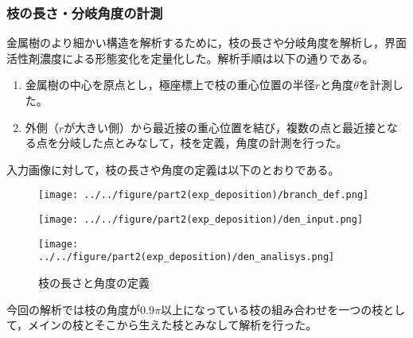 \documentclass[autodetect-engine,dvi=dvipdfmx,a4paper,ja=standard,oneside,openany,11pt,draft]{bxjsarticle}
\begin{document}
\subsubsection{枝の長さ・分岐角度の計測}
金属樹のより細かい構造を解析するために，枝の長さや分岐角度を解析し，界面活性剤濃度による形態変化を定量化した。解析手順は以下の通りである。
\begin{enumerate}
  \item 金属樹の中心を原点とし，極座標上で枝の重心位置の半径$r$と角度$\theta$を計測した。
  \item 外側（$r$が大きい側）から最近接の重心位置を結び，複数の点と最近接となる点を分岐した点とみなして，枝を定義，角度の計測を行った。
\end{enumerate}
入力画像に対して，枝の長さや角度の定義は以下のとおりである。
\begin{figure}
  \begin{minipage}
    {0.32\textwidth}
    \centering
    \texttt{[image: ../../figure/part2(exp\_deposition)/branch\_def.png]}
    \label{fig:branch_def}
  \end{minipage}
  \begin{minipage}
    {0.32\textwidth}
    \centering
    \texttt{[image: ../../figure/part2(exp\_deposition)/den\_input.png]}
    \label{fig:den_input}
  \end{minipage}
  \begin{minipage}
    {0.32\textwidth}
    \centering
    \texttt{[image: ../../figure/part2(exp\_deposition)/den\_analisys.png]}
    \label{fig:den_analisys}
  \end{minipage}
  \caption{枝の長さと角度の定義}
\end{figure}
今回の解析では枝の角度が$0.9\pi$以上になっている枝の組み合わせを一つの枝として，メインの枝とそこから生えた枝とみなして解析を行った。
\end{document}
